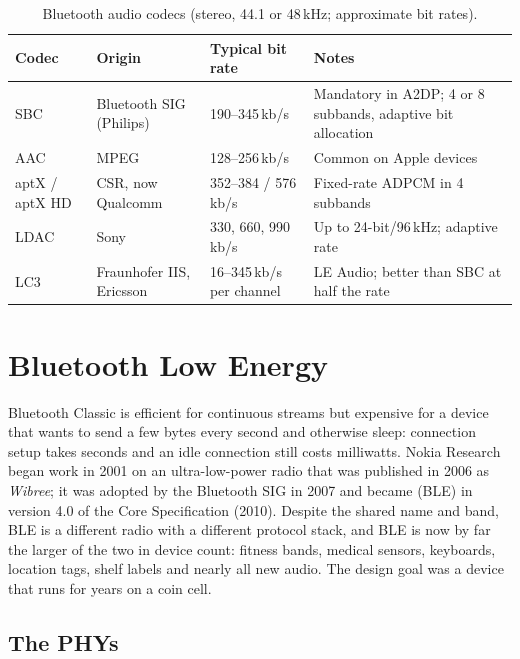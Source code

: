 \begin{table}[htbp]\centering\small
\caption{Bluetooth audio codecs (stereo, 44.1 or 48\,kHz; approximate bit rates).}
\label{tab:ch22:codecs}
\begin{tabularx}{\linewidth}{@{}l l l X@{}}
\toprule
Codec & Origin & Typical bit rate & Notes\\
\midrule
SBC & Bluetooth SIG (Philips) & 190--345\,kb/s & Mandatory in A2DP; 4 or 8 subbands, adaptive bit allocation\\
AAC & MPEG & 128--256\,kb/s & Common on Apple devices\\
aptX / aptX HD & CSR, now Qualcomm & 352--384 / 576\,kb/s & Fixed-rate ADPCM in 4 subbands\\
LDAC & Sony & 330, 660, 990\,kb/s & Up to 24-bit/96\,kHz; adaptive rate\\
LC3 & Fraunhofer IIS, Ericsson & 16--345\,kb/s per channel & LE Audio; better than SBC at half the rate\\
\bottomrule
\end{tabularx}
\end{table}

\section{Bluetooth Low Energy}
\label{sec:ch22:ble}

Bluetooth Classic is efficient for continuous streams but expensive for a device that wants to send
a few bytes every second and otherwise sleep: connection setup takes seconds and an idle connection
still costs milliwatts. Nokia Research began work in 2001 on an ultra-low-power radio that was
published in 2006 as \emph{Wibree}; it was adopted by the Bluetooth SIG in 2007 and became
 (BLE) in version 4.0 of the Core Specification (2010). Despite the shared
name and band, BLE is a different radio with a different protocol stack, and BLE is now by far the
larger of the two in device count: fitness bands, medical sensors, keyboards, location tags, shelf
labels and nearly all new audio. The design goal was a device that runs for years on a coin cell.

\subsection{The PHYs}


